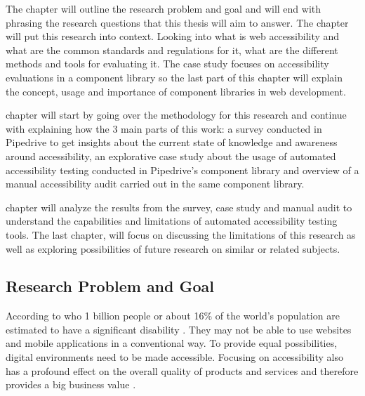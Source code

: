 \documentclass{master_thesis}
\begin{document}

The  chapter will outline the research problem and goal and will end with phrasing the research questions that this thesis will aim to answer. The  chapter will put this research into context. Looking into what is web accessibility and what are the common standards and regulations for it, what are the different methods and tools for evaluating it. The case study focuses on accessibility evaluations in a component library so the last part of this chapter will explain the concept, usage and importance of component libraries in web development.

 chapter will start by going over the methodology for this research and continue with explaining how the 3 main parts of this work: a survey conducted in Pipedrive to get insights about the current state of knowledge and awareness around accessibility, an explorative case study about the usage of automated accessibility testing conducted in Pipedrive's component library and overview of a manual accessibility audit carried out in the same component library.

 chapter will analyze the results from the survey, case study and manual audit to understand the capabilities and limitations of automated accessibility testing tools. The last chapter,  will focus on discussing the limitations of this research as well as exploring possibilities of future research on similar or related subjects.

\subsection{Research Problem and Goal}


According to \ac{who} 1 billion people or about 16\% of the world's population are estimated to have a significant disability \citep{WHO2022}. They may not be able to use websites and mobile applications in a conventional way. To provide equal possibilities, digital environments need to be made accessible. Focusing on accessibility also has a profound effect on the overall quality of products and services and therefore provides a big business value \citep{Miesenberger2020}.
\end{document}
